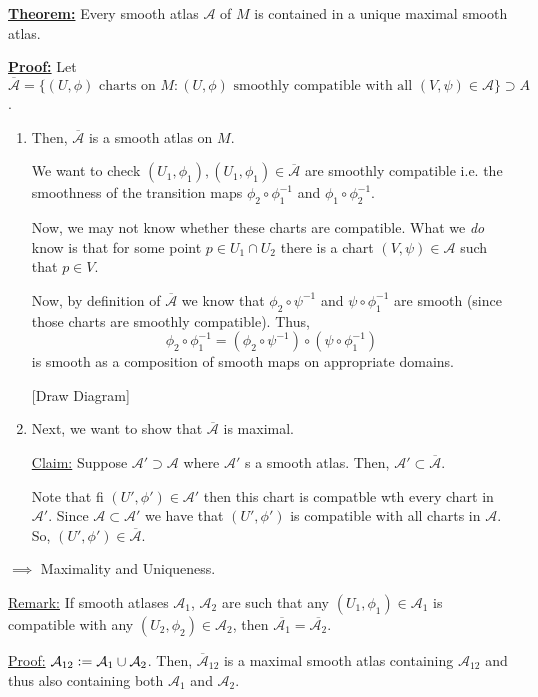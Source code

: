 \documentclass{article}
\newcommand{\defeq}{\vcentcolon=}
\begin{document}
\vskip 1cm
\begin{dottedbox}
  \underline{\textbf{Theorem:}} Every smooth atlas $\mathcal{A}$ of $M$ is contained in a unique maximal smooth atlas.

  \vskip 0.5cm
  \underline{\textbf{Proof:}} Let $\overline{\mathcal{A}} = \{ (U, \phi) \text{ charts on }M : (U, \phi) \text{ smoothly compatible with all } (V, \psi) \in \mathcal{A} \} \supset A$. 
  \begin{enumerate}
    \item Then, $\overline{\mathcal{A}}$ is a smooth atlas on $M$. 
    
    \vskip 0.5cm
    We want to check $(U_1, \phi_1), (U_1, \phi_1) \in \overline{\mathcal{A}}$ are smoothly compatible i.e. the smoothness of the transition maps $\phi_2 \circ \phi_1^{-1}$ and $\phi_1 \circ \phi_2^{-1}$. 
    
    
    Now, we may not know whether these charts are compatible. What we \emph{do} know is that for some point $p \in U_1 \cap U_2$ there is a chart $(V, \psi) \in \mathcal{A}$ such that $p \in V$.

    Now, by definition of $\overline{\mathcal{A}}$ we know that $\phi_2 \circ \psi^{-1}$ and $\psi \circ \phi_1^{-1}$ are smooth (since those charts are smoothly compatible). Thus, 
    \[ \phi_2 \circ \phi_1^{-1} = (\phi_2 \circ \psi^{-1}) \circ (\psi \circ \phi_1^{-1}) \] is smooth as a composition of smooth maps on appropriate domains.

    [Draw Diagram]

    \vskip 0.5cm
    \item Next, we want to show that $\overline{\mathcal{A}}$ is maximal. 
    
    \vskip 0.25cm
    \underline{Claim:} Suppose $\mathcal{A}' \supset \mathcal{A}$ where $\mathcal{A}'$ s a smooth atlas. Then, $\mathcal{A}' \subset \overline{\mathcal{A}}$.

    \vskip 0.25cm
    Note that fi $(U', \phi') \in \mathcal{A}'$ then this chart is compatble wth every chart in $\mathcal{A}'$. Since $\mathcal{A} \subset \mathcal{A}'$ we have that $(U', \phi')$ is compatible with all charts in $\mathcal{A}$. So, $(U', \phi') \in \overline{\mathcal{A}}$.
  \end{enumerate}
  $\implies$ Maximality and Uniqueness.

  \vskip 0.5cm
  \underline{Remark:} If smooth atlases $\mathcal{A}_1$, $\mathcal{A}_2$ are such that any $(U_1, \phi_1) \in \mathcal{A}_1$ is compatible with any $(U_2, \phi_2) \in \mathcal{A}_2$, then $\overline{\mathcal{A}_1} = \overline{\mathcal{A}_2}$.

  \vskip 0.5cm
  \underline{Proof:} $\mathcal{A}_{12} \defeq \mathcal{A}_1 \cup \mathcal{A}_2$. Then, $\overline{\mathcal{A}}_{12}$ is a maximal smooth atlas containing $\mathcal{A}_{12}$ and thus also containing both $\mathcal{A}_1$ and $\mathcal{A}_2$. 
\end{dottedbox}
\end{document}

